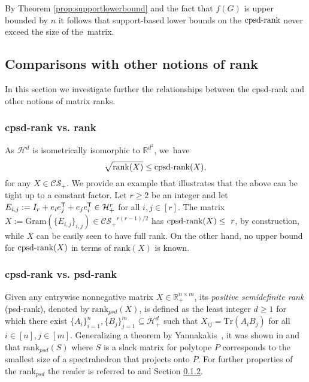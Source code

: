 \documentclass{siamart}
\begin{document}
{{{By {Theorem}  \ref{prop:supportlowerbound} and the fact that $f(G)$  is upper bounded  by $n$  it  follows   that {support-based} lower bounds on the ${\mathrm{cpsd}\textnormal{-rank}}$ never exceed the size of the~matrix.

\subsection{{{Comparisons} with other notions of rank}}\label{sec:comparison}

In this section we investigate further the {relationships} between the cpsd-rank and other
notions of matrix ranks.

\subsubsection{cpsd-rank vs. rank} \label{ssr}

As ${\mathcal{H}}^d$ is isometrically isomorphic to ${\mathbb{R}}^{d^2}$,  we~have
\begin{equation}
\label{eq:rank}
\sqrt{{\mathrm{rank}}(X)}\le {\mathrm{cpsd}\textnormal{-rank}}(X),
\end{equation}
for any $X\in {\mathcal{CS}_+}$.
We provide an example that illustrates that the above can be tight up to a constant factor. Let $r \geq 2$ be an integer and let
$E_{i,j}:=I_r+e_ie_j^{{\sf T}}+e_je_i^{{\sf T}}\in {\mathcal{H}}^r_+$ for all $i,j\in [r]$. The matrix $X:={\mathrm{Gram}}(\{E_{i,j}\}_{i,j})\in {\mathcal{CS}_+}^{r(r-1)/2}$
has ${\mathrm{cpsd}\textnormal{-rank}}(X)\le~r$, by construction, while $X$ can be easily seen to have full rank.
On the other hand, no upper bound for ${\mathrm{cpsd}\textnormal{-rank}}(X)$ in terms of ${\mathrm{rank}}(X)$ is known.

\subsubsection{cpsd-rank vs. psd-rank} \label{psdvscpsd}

Given any entrywise nonnegative matrix $X \in {\mathbb{R}}^{n \times m}_{+}$,
its {\em positive semidefinite rank} {(psd-rank)}, denoted by
${\mathrm{rank}_{psd}}(X)$, is defined as the least integer $d\ge 1$ for which there
exist $\{A_i\}_{i=1}^n, \{B_j\}_{j=1}^m\subseteq {\mathcal{H}}^d_+$ such
that $X_{ij}={\mathrm{Tr}}(A_iB_j)$ for all $i\in [n],j\in [m]$. Generalizing
a theorem by  Yannakakis~\cite{Yan}, it was shown in \cite{FMPTW}
and \cite{GPT} that ${\mathrm{rank}_{psd}}(S)$ where $S$ is a slack matrix for
polytope $P$ corresponds to the smallest size of a spectrahedron
that projects onto $P$.  For further properties of the ${\mathrm{rank}_{psd}}$ the
reader is referred to   \cite{FGPRT} and Section \ref{psdvscpsd}.

}}}
\end{document}
